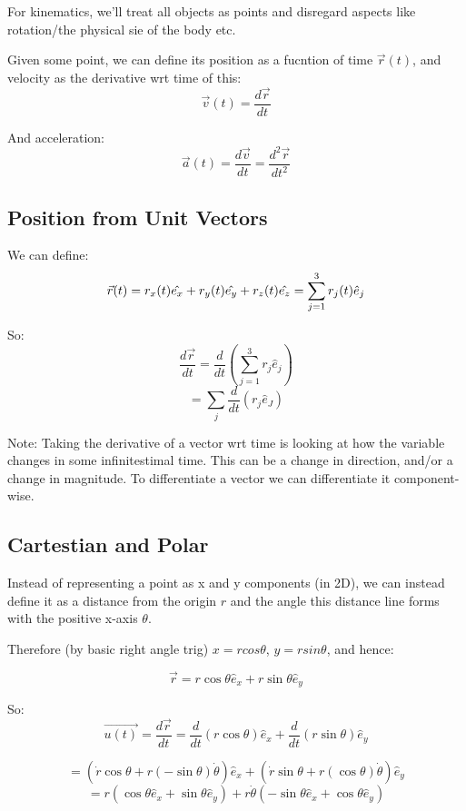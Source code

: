 \graphicspath{{figures/}}
For kinematics, we'll treat all objects as points and disregard aspects like rotation/the physical sie of the body etc.

Given some point, we can define its position as a fucntion of time $\vec{r}(t)$, and velocity as the derivative wrt time of this:
\[
    \vec{v}(t) = \frac{d \vec{r}}{dt}
\]

And acceleration:
\[
    \vec{a}(t) = \frac{d \vec{v}}{dt} =\frac{d^2 \vec{r}}{dt^2}
\]

\subsection*{Position from Unit Vectors}
We can define:
\[
    \vec{r}(t) = r_x(t) \hat{e_x} + r_y(t) \hat{e_y} + r_z(t) \hat{e_z}\\
    = \sum_{j=1}^{3} r_j(t) \hat{e}_j
\]

So:
\[
    \frac{d \vec{r}}{dt} = \frac{d}{dt} \left(\sum_{j=1}^{3} r_j \hat{e}_j\right)
\]
\[
    = \sum_j \frac{d}{dt}(r_j \hat{e}_J)
\]

Note: Taking the derivative of a vector wrt time is looking at how the variable changes in some infinitestimal time. This can be a change in direction, and/or a change in magnitude. To differentiate a vector we can differentiate it component-wise.

\subsection*{Cartestian and Polar}
Instead of representing a point as x and y components (in 2D), we can instead define it as a distance from the origin $r$ and the angle this distance line forms with the positive x-axis $\theta$.

Therefore (by basic right angle trig) $x = rcos \theta$, $y = rsin \theta$, and hence:

\[
    \vec{r} = r \cos \theta \hat{e}_x + r \sin \theta \hat{e}_y
\]

So:
\[
    \vec{u(t)} = \frac{d \vec{r}}{dt} = \frac{d}{dt} (r \cos \theta) \hat{e}_x + \frac{d}{dt} (r \sin \theta) \hat{e}_y
\]

\[
    = \left(\dot{r}\cos \theta + r (-\sin \theta) \dot{\theta}\right) \hat{e}_x + \left(\dot{r} \sin \theta + r (\cos \theta) \dot{\theta}\right) \hat{e}_y
\]
\[
    = r \left(\cos \theta \hat{e}_x + \sin \theta \hat{e}_y\right) + r \dot{\theta} \left(-\sin \theta \hat{e}_x + \cos \theta \hat{e}_y\right)
\]



